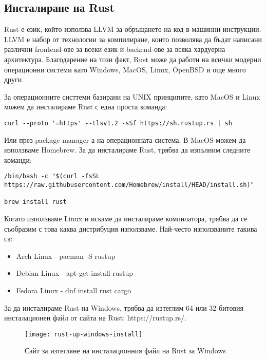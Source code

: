 \subsection{Инсталиране на Rust}
Rust е език, който използва LLVM за обръщането на код в машинни инструкции.
LLVM е набор от технологии за компилиране, които позволява да бъдат написани
различни frontend-ове за всеки език и backend-ове за всяка хардуерна архитектура.
Благодарение на този факт, Rust може да работи на всички модерни операционни системи
като Windows, MacOS, Linux, OpenBSD и още много други.

За операционните систтеми базирани на UNIX принципите, като MacOS и Linux можем
да инсталираме Rust с една проста команда:
\begin{lstlisting}
curl --proto '=https' --tlsv1.2 -sSf https://sh.rustup.rs | sh
\end{lstlisting}

Или през package manager-а на операционната система.
В MacOS можем да използваме Homebrew. За да инсталираме Rust, трябва да изпълним следните команди:
\begin{lstlisting}
/bin/bash -c "$(curl -fsSL https://raw.githubusercontent.com/Homebrew/install/HEAD/install.sh)"

brew install rust
\end{lstlisting}

Когато използваме Linux и искаме да инсталираме компилатора, трябва да се
съобразим с това каква дистрибуция използваме. Най-често използваните такива
са: \begin{itemize}
\item Arch Linux - pacman -S rustup
\item Debian Linux - apt-get install rustup
\item Fedora Linux - dnf install rust cargo
\end{itemize}

За да инсталираме Rust на Windows, трябва да изтеглим 64 или 32 битовия
инсталационен файл от сайта на Rust: https://rustup.rs/. 

\begin{figure}[!htb]
  \texttt{[image: rust-up-windows-install]}
  \centering
  \caption{Сайт за изтегляне на инсталационния файл на Rust за Windows}
  \label{fig:rust-up-windows-install}
\end{figure}
